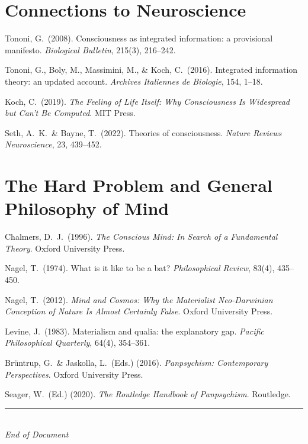 \documentclass[11pt,a4paper]{report}
\begin{document}
\section*{Connections to Neuroscience}
\begin{enumerate}[label={[\arabic*]}, leftmargin=2.5em, start=21]
  \item Tononi, G.\ (2008). Consciousness as integrated information: a provisional manifesto. \textit{Biological Bulletin}, 215(3), 216--242.
  \item Tononi, G., Boly, M., Massimini, M., \& Koch, C.\ (2016). Integrated information theory: an updated account. \textit{Archives Italiennes de Biologie}, 154, 1--18.
  \item Koch, C.\ (2019). \textit{The Feeling of Life Itself: Why Consciousness Is Widespread but Can't Be Computed}. MIT Press.
  \item Seth, A.\ K.\ \& Bayne, T.\ (2022). Theories of consciousness. \textit{Nature Reviews Neuroscience}, 23, 439--452.
\end{enumerate}

\section*{The Hard Problem and General Philosophy of Mind}
\begin{enumerate}[label={[\arabic*]}, leftmargin=2.5em, start=25]
  \item Chalmers, D.\ J.\ (1996). \textit{The Conscious Mind: In Search of a Fundamental Theory}. Oxford University Press.
  \item Nagel, T.\ (1974). What is it like to be a bat? \textit{Philosophical Review}, 83(4), 435--450.
  \item Nagel, T.\ (2012). \textit{Mind and Cosmos: Why the Materialist Neo-Darwinian Conception of Nature Is Almost Certainly False}. Oxford University Press.
  \item Levine, J.\ (1983). Materialism and qualia: the explanatory gap. \textit{Pacific Philosophical Quarterly}, 64(4), 354--361.
  \item Br\"untrup, G.\ \& Jaskolla, L.\ (Eds.) (2016). \textit{Panpsychism: Contemporary Perspectives}. Oxford University Press.
  \item Seager, W.\ (Ed.) (2020). \textit{The Routledge Handbook of Panpsychism}. Routledge.
\end{enumerate}

\vfill
\begin{center}
  {\color{gray}\rule{0.4\textwidth}{0.5pt}}\\[8pt]
  {\small\color{gray}\itshape End of Document}
\end{center}
\end{document}
